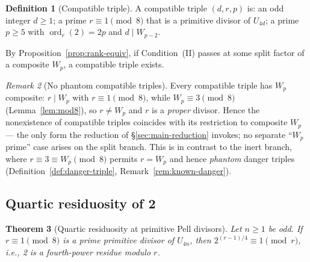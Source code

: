 \documentclass[11pt]{amsart}
\theoremstyle{plain}
\newtheorem{theorem}{Theorem}[section]
\theoremstyle{definition}
\newtheorem{definition}[theorem]{Definition}
\theoremstyle{remark}
\newtheorem{remark}[theorem]{Remark}
\numberwithin{equation}{section}
\newcommand{\ord}{\operatorname{ord}}
\begin{document}
\begin{definition}[Compatible triple]\label{def:compat-triple}
A compatible triple $(d, r, p)$ is: an odd integer $d \geq 1$; a prime $r \equiv 1 \pmod 8$ that is a primitive divisor of $U_{4d}$; a prime $p \geq 5$ with $\ord_r(2) = 2p$ and $d \mid W_{p-2}$.
\end{definition}

By Proposition~\ref{prop:rank-equiv}, if Condition~(II) passes at some split factor of a composite $W_p$, a compatible triple exists.

\begin{remark}[No phantom compatible triples]\label{rem:no-phantom-split}
Every compatible triple has $W_p$ composite: $r \mid W_p$ with $r \equiv 1 \pmod 8$, while $W_p \equiv 3 \pmod 8$ (Lemma~\ref{lem:mod8}), so $r \neq W_p$ and $r$ is a \emph{proper} divisor. Hence the nonexistence of compatible triples coincides with its restriction to composite $W_p$ --- the only form the reduction of \S\ref{sec:main-reduction} invokes; no separate ``$W_p$ prime'' case arises on the split branch. This is in contrast to the inert branch, where $r \equiv 3 \equiv W_p \pmod 8$ permits $r = W_p$ and hence \emph{phantom} danger triples (Definition~\ref{def:danger-triple}, Remark~\ref{rem:known-danger}).
\end{remark}

\subsection{Quartic residuosity of 2}

\begin{theorem}[Quartic residuosity at primitive Pell divisors]\label{thm:quartic}
Let $n \geq 1$ be odd. If $r \equiv 1 \pmod 8$ is a prime primitive divisor of $U_{4n}$, then $2^{(r-1)/4} \equiv 1 \pmod r$, i.e., 2 is a fourth-power residue modulo $r$.
\end{theorem}
\end{document}
